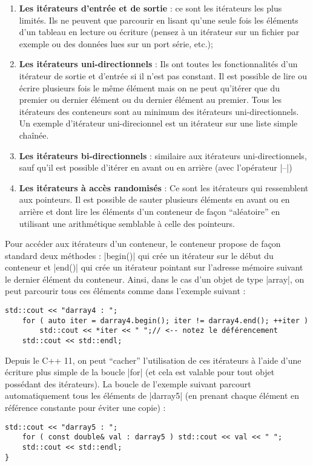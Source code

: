 \begin{enumerate}
  \item \textbf{Les itérateurs d'entrée et de sortie} : ce sont les itérateurs les plus limités. Ils ne peuvent que parcourir en lisant qu'une seule fois les éléments d'un tableau en lecture ou écriture (pensez à un itérateur sur un fichier par exemple ou des données lues sur un port série, etc.);
  \item \textbf{Les itérateurs uni-directionnels} : Ils ont toutes les fonctionnalités d'un itérateur de sortie et d'entrée si il n'est pas constant. Il est possible de lire ou écrire plusieurs fois le même élément mais on ne peut qu'itérer que du premier ou dernier élément ou du dernier élément au premier. Tous les itérateurs des conteneurs sont au minimum des itérateurs uni-directionnels. Un exemple d'itérateur uni-direcionnel est un itérateur sur une liste simple chaînée.
  \item \textbf{Les itérateurs bi-directionnels} : similaire aux itérateurs uni-directionnels, sauf qu'il est possible d'itérer en avant ou en arrière (avec l'opérateur |--|)
  \item \textbf{Les itérateurs à accès randomisés} : Ce sont les itérateurs qui ressemblent aux pointeurs. Il est possible de sauter plusieurs éléments en avant ou en arrière et dont lire les éléments d'un conteneur de façon ``aléatoire'' en utilisant une arithmétique semblable à celle des pointeurs.
\end{enumerate}

Pour accéder aux itérateurs d'un conteneur, le conteneur propose de façon standard deux méthodes : |begin()| qui crée un itérateur sur le début du conteneur et |end()| qui crée un itérateur pointant sur l'adresse mémoire suivant le dernier élément du conteneur. Ainsi, dans le cas d'un objet de type |array|, on peut parcourir tous ces éléments comme dans l'exemple suivant :

\begin{lstlisting}[caption=utilisation explicite des itérateurs pour array]
    std::cout << "darray4 : ";
    for ( auto iter = darray4.begin(); iter != darray4.end(); ++iter )
        std::cout << *iter << " ";// <-- notez le déférencement
    std::cout << std::endl;
\end{lstlisting}

Depuis le C++ 11, on peut ``cacher'' l'utilisation de ces itérateurs à l'aide d'une écriture plus simple de la boucle |for| (et cela est valable pour tout objet possédant des itérateurs). La boucle de l'exemple suivant parcourt automatiquement tous les éléments de |darray5| (en prenant chaque élément en référence constante pour éviter une copie) :
\begin{lstlisting}[caption=utilisation implicite des itérateurs pour array]
    std::cout << "darray5 : ";
    for ( const double& val : darray5 ) std::cout << val << " ";
    std::cout << std::endl;
}
\end{lstlisting}

